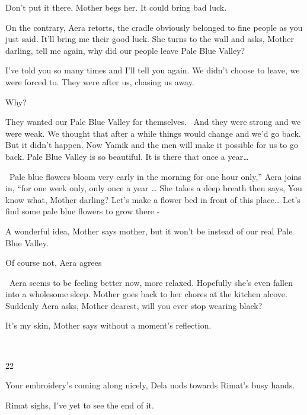 \documentclass[letterpaper]{article}
\begin{document}
{\textquotedbl}Don't put it there,{\textquotedbl} Mother begs her. {\textquotedbl}It could bring bad
luck.{\textquotedbl} 

{\textquotedbl}On the contrary,{\textquotedbl} Aera retorts, {\textquotedbl}the cradle obviously belonged to fine people
as you just said. It'll bring me their good luck.{\textquotedbl} She turns to the wall and asks, {\textquotedbl}Mother
darling, tell me again, why did our people leave Pale Blue Valley?{\textquotedbl} 

{\textquotedbl}I've told you so many times and I'll tell you again. We didn't choose to leave, we were forced to. They
were after us, chasing us away.{\textquotedbl} 

{\textquotedbl}Why?{\textquotedbl} 

{\textquotedbl}They wanted our Pale Blue Valley for themselves. ~And they were strong and we were weak. We thought that
after a while things would change and we'd go back. But it didn't happen. Now Yamik and the men will make it possible
for us to go back. Pale Blue Valley is so beautiful. It is there that once a year{\dots} {\textquotedbl} 

\ {\textquotedbl}Pale blue flowers bloom very early in the morning for one hour only,'' Aera joins in, ``for one week
only, only once a year {\dots}{\textquotedbl} She takes a deep breath then says, {\textquotedbl}You know what, Mother
darling? Let's make a flower bed in front of this place{\dots} Let's find some pale blue flowers to grow there
-{\textquotedbl}

{\textquotedbl}A wonderful idea,{\textquotedbl} Mother says mother,{\textquotedbl} but it won't be instead of our real
Pale Blue Valley.{\textquotedbl}

{\textquotedbl}Of course not,{\textquotedbl} Aera agrees

\ Aera seems to be feeling better now, more relaxed. Hopefully she's even fallen into a wholesome sleep. Mother goes
back to her chores at the kitchen alcove. Suddenly Aera asks, {\textquotedbl}Mother dearest, will you ever stop wearing
black?{\textquotedbl} 

{\textquotedbl}It's my\textcolor{red}{ }skin,{\textquotedbl} Mother says without a moment's reflection. 

~

22~~

{\textquotedbl}Your embroidery's coming along nicely,{\textquotedbl} Dela nods towards Rimat's busy hands. 

Rimat sighs, {\textquotedbl}I've yet to see the end of it.{\textquotedbl} 
\end{document}
